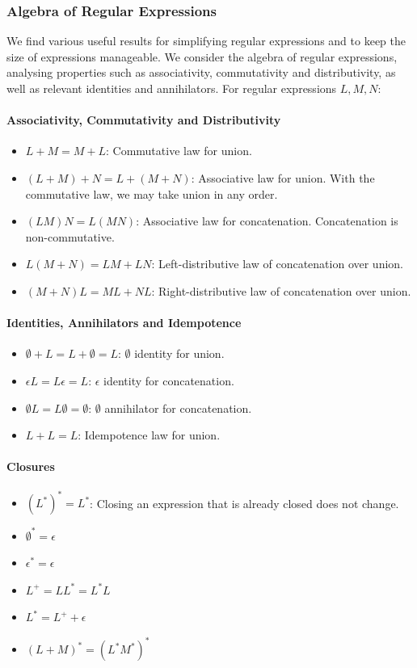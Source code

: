 \subsubsection{Algebra of Regular Expressions}
We find various useful results for simplifying regular expressions and to keep
the size of expressions manageable. We consider the algebra of regular
expressions, analysing properties such as associativity, commutativity and
distributivity, as well as relevant identities and annihilators. For regular
expressions $L, M, N$:
\paragraph{Associativity, Commutativity and Distributivity}
\begin{itemize}
  \item $L+M=M+L$: Commutative law for union.
  \item  $(L+M)+N=L+(M+N)$: Associative law for union. With the commutative
    law, we may take union in any order.
  \item $(LM)N=L(MN)$: Associative law for concatenation. Concatenation is non-commutative.
  \item $L(M+N)=LM+LN$: Left-distributive law of concatenation over union.
  \item $(M+N)L=ML+NL$: Right-distributive law of concatenation over union.
\end{itemize}
\paragraph{Identities, Annihilators and Idempotence}
\begin{itemize}
  \item $\emptyset+L=L+\emptyset=L$: $\emptyset $ identity for union.
  \item $\epsilon L = L \epsilon=L$: $\epsilon$ identity for concatenation.
  \item $\emptyset L=L\emptyset =\emptyset $: $\emptyset $ annihilator for concatenation.
  \item $L + L = L$: Idempotence law for union.
\end{itemize}
\paragraph{Closures}
\begin{itemize}
  \item ${\left( L^{*} \right)} ^{*}=L^{*}$: Closing an expression that is
    already closed does not change.
  \item $\emptyset ^{*}=\epsilon$
  \item $\epsilon^{*}=\epsilon$ 
  \item $L^{+}=LL^{*}=L^{*}L$ 
  \item $L^{*}=L^{+}+\epsilon$
  \item ${(L+M)}^{*}={(L^{*}M^{*})}^{*}$
\end{itemize}

